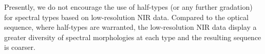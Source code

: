 \documentclass[12pt]{aastex6}
\begin{document}

Presently, we do not encourage the use of half-types (or any further gradation) for spectral types based on low-resolution NIR data.
Compared to the optical sequence, where half-types are warranted, the low-resolution NIR data display a greater diversity of spectral morphologies at each type and the resulting sequence is coarser.

\end{document}
